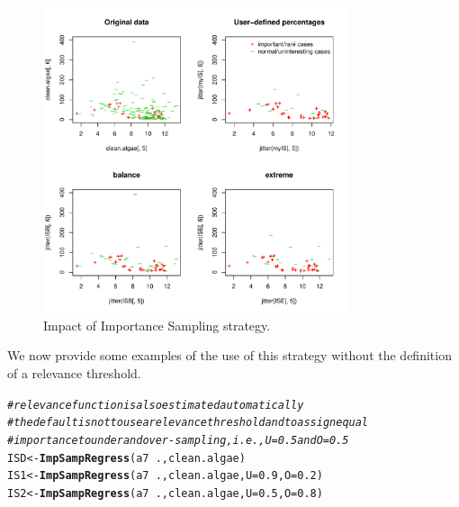 \documentclass[10pt,a4paper]{article}\usepackage[]{graphicx}\usepackage[]{color}
\makeatletter
\newcommand{\hlnum}[1]{\textcolor[rgb]{0.686,0.059,0.569}{#1}}%
\newcommand{\hlcom}[1]{\textcolor[rgb]{0.678,0.584,0.686}{\textit{#1}}}%
\newcommand{\hlopt}[1]{\textcolor[rgb]{0,0,0}{#1}}%
\newcommand{\hlstd}[1]{\textcolor[rgb]{0.345,0.345,0.345}{#1}}%
\newcommand{\hlkwb}[1]{\textcolor[rgb]{0.69,0.353,0.396}{#1}}%
\newcommand{\hlkwc}[1]{\textcolor[rgb]{0.333,0.667,0.333}{#1}}%
\newcommand{\hlkwd}[1]{\textcolor[rgb]{0.737,0.353,0.396}{\textbf{#1}}}%
\newenvironment{kframe}{%
 \def\at@end@of@kframe{}%
 \ifinner\ifhmode%
  \def\at@end@of@kframe{\end{minipage}}%
  \begin{minipage}{\columnwidth}%
 \fi\fi%
 \def\FrameCommand##1{\hskip\@totalleftmargin \hskip-\fboxsep
 \colorbox{shadecolor}{##1}\hskip-\fboxsep
     \hskip-\linewidth \hskip-\@totalleftmargin \hskip\columnwidth}%
 \MakeFramed {\advance\hsize-\width
   \@totalleftmargin\z@ \linewidth\hsize
   \@setminipage}}%
 {\par\unskip\endMakeFramed%
 \at@end@of@kframe}
\newenvironment{knitrout}{}{} %
\makeatother
\begin{document}
\begin{knitrout}\footnotesize
{}\color{fgcolor}\begin{figure}

{\centering \includegraphics[width=0.8\textwidth]{figures/UBL-IS_plot2-1} 

}

\caption[Impact of Importance Sampling strategy]{Impact of Importance Sampling strategy.}\label{fig:IS_plot2}
\end{figure}


\end{knitrout}

We now provide some examples of the use of this strategy without the definition of a relevance threshold.

\begin{knitrout}\footnotesize
{}\color{fgcolor}\begin{kframe}
\begin{alltt}
\hlcom{# relevance function is also estimated automatically}
\hlcom{# the default is not to use a relevance threshold and to assign equal }
\hlcom{# importance to under and over-sampling, i.e., U=0.5 and O=0.5}
\hlstd{ISD} \hlkwb{<-} \hlkwd{ImpSampRegress}\hlstd{(a7}\hlopt{~}\hlstd{., clean.algae)}
\hlstd{IS1} \hlkwb{<-} \hlkwd{ImpSampRegress}\hlstd{(a7}\hlopt{~}\hlstd{., clean.algae,} \hlkwc{U}\hlstd{=}\hlnum{0.9}\hlstd{,} \hlkwc{O}\hlstd{=}\hlnum{0.2}\hlstd{)}
\hlstd{IS2} \hlkwb{<-} \hlkwd{ImpSampRegress}\hlstd{(a7}\hlopt{~}\hlstd{., clean.algae,} \hlkwc{U}\hlstd{=}\hlnum{0.5}\hlstd{,} \hlkwc{O}\hlstd{=}\hlnum{0.8}\hlstd{)}
\end{alltt}
\end{kframe}
\end{knitrout}
\end{document}
